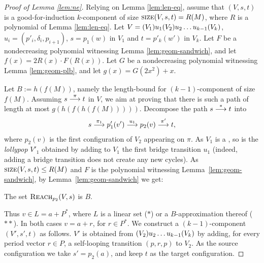 
\begin{proof}[Proof of Lemma \ref{lem:ne}]
Relying on Lemma \ref{lem:len-eq}, assume \mywlog that
$(V, s, t)$ is a 
good-for-induction $k$-component \tvass of size
$\textsc{size}(V, s, t) = R(M)$, where $R$ is a polynomial of Lemma \ref{lem:len-eq}.
Let $V = (V_1) u_1 (V_2) u_2 \ldots u_{k-1} (V_k)$, $u_i = (p'_i, \delta_i, p_{i+1})$,
$s=p_1(w)$ in $V_1$ and $t=p'_k(w')$ in $V_k$.
%
Let $F$ be a nondecreasing polynomial witnessing 
Lemma \ref{lem:geom-sandwich}, and
let $f(x) = 2R(x) \cdot F(R(x))$. 
Let $G$ be a nondecreasing polynomial witnessing Lemma  \ref{lem:geom-plb}, and
let $g(x) = G(2x^2) + x$.


Let $B := h(f(M))$, namely the length-bound for $(k-1)$-component \vass of size $f(M)$.
Assuming $s\stackrel{\pi}{\longrightarrow} t$ in $ V$, we aim at proving that there is such a path of length at most
$g(h(f(h(f(M)))))$.
Decompose the path $s\stackrel{*}{\longrightarrow} t$ into
%
\begin{align} \label{eq:pathV}
s \stackrel{\pi_1}{\longrightarrow} p'_1(v') \stackrel{u_1}{\longrightarrow} p_2(v) \stackrel{\pi'}{\longrightarrow} t,
\end{align}
%
where $p_2(v)$ is the first configuration of $V_2$ appearing on $\pi$.
As $V_1$ is a \geomvass, so is the \emph{lollypop} \tvass $V'_1$ 
obtained by adding to $V_1$ the first bridge transition $u_1$
(indeed, adding a bridge transition does not create any new cycles).
As $\textsc{size}(V,s,t) \leq R(M)$ and $F$ is the polynomial witnessing Lemma~\ref{lem:geom-sandwich},
by Lemma~\ref{lem:geom-sandwich} we get:
%
\begin{claim}
The set $\textsc{Reach}_{p_2}(V,s)$ is   {$B$}.
\end{claim}

Thus $v \in L = a + P^*$, where $L$ is a linear set ($*$) or a $B$-approximation thereof ($**$).
In both cases  $v = a + r$, for $r\in P^*$.
%
We construct a $(k-1)$-component \tvass $(V', s', t)$ as follows.
$V'$ is obtained from $(V_2) u_2 \ldots u_{k-1} (V_k)$ by adding,
for every period vector $r\in P$, a self-looping transition
$(p, r, p)$ to $ V_2$.
As the source configuration we take $s' = p_2(a)$, and keep $t$ as the target configuration.


\end{proof}
